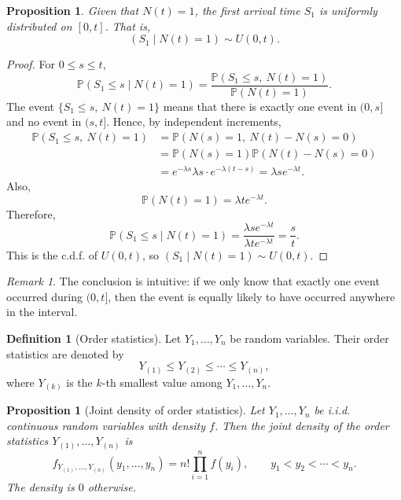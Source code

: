 \documentclass[11pt]{article}
\theoremstyle{plain}
\newtheorem{proposition}[theorem]{Proposition}
\theoremstyle{definition}
\newtheorem{definition}[theorem]{Definition}
\theoremstyle{remark}
\newtheorem{remark}[theorem]{Remark}
\begin{document}
	\begin{proposition}
		Given that \(N(t)=1\), the first arrival time \(S_1\) is uniformly distributed on \([0,t]\). That is,
		\[
		(S_1\mid N(t)=1)\sim U(0,t).
		\]
	\end{proposition}
	
	\begin{proof}
		For \(0\le s\le t\),
		\[
		\mathbb{P}(S_1\le s\mid N(t)=1)
		=
		\frac{\mathbb{P}(S_1\le s,\ N(t)=1)}{\mathbb{P}(N(t)=1)}.
		\]
		The event \(\{S_1\le s,\ N(t)=1\}\) means that there is exactly one event in \((0,s]\) and no event in \((s,t]\). Hence, by independent increments,
		\begin{align*}
			\mathbb{P}(S_1\le s,\ N(t)=1)
			&=\mathbb{P}(N(s)=1,\ N(t)-N(s)=0)\\
			&=\mathbb{P}(N(s)=1)\mathbb{P}(N(t)-N(s)=0)\\
			&=e^{-\lambda s}\lambda s\cdot e^{-\lambda(t-s)}
			=\lambda s e^{-\lambda t}.
		\end{align*}
		Also,
		\[
		\mathbb{P}(N(t)=1)=\lambda t e^{-\lambda t}.
		\]
		Therefore,
		\[
		\mathbb{P}(S_1\le s\mid N(t)=1)=\frac{\lambda s e^{-\lambda t}}{\lambda t e^{-\lambda t}}=\frac{s}{t}.
		\]
		This is the c.d.f. of \(U(0,t)\), so \((S_1\mid N(t)=1)\sim U(0,t)\).
	\end{proof}
	
	\begin{remark}
		The conclusion is intuitive: if we only know that exactly one event occurred during \((0,t]\), then the event is equally likely to have occurred anywhere in the interval.
	\end{remark}
	
	\begin{definition}[Order statistics]
		Let \(Y_1,\dots,Y_n\) be random variables. Their order statistics are denoted by
		\[
		Y_{(1)}\le Y_{(2)}\le \cdots\le Y_{(n)},
		\]
		where \(Y_{(k)}\) is the \(k\)-th smallest value among \(Y_1,\dots,Y_n\).
	\end{definition}
	
	\begin{proposition}[Joint density of order statistics]
		Let \(Y_1,\dots,Y_n\) be i.i.d. continuous random variables with density \(f\). Then the joint density of the order statistics \(Y_{(1)},\dots,Y_{(n)}\) is
		\[
		f_{Y_{(1)},\dots,Y_{(n)}}(y_1,\dots,y_n)
		=
		n!\prod_{i=1}^{n}f(y_i),
		\qquad y_1<y_2<\cdots<y_n.
		\]
		The density is \(0\) otherwise.
	\end{proposition}
	
\end{document}
